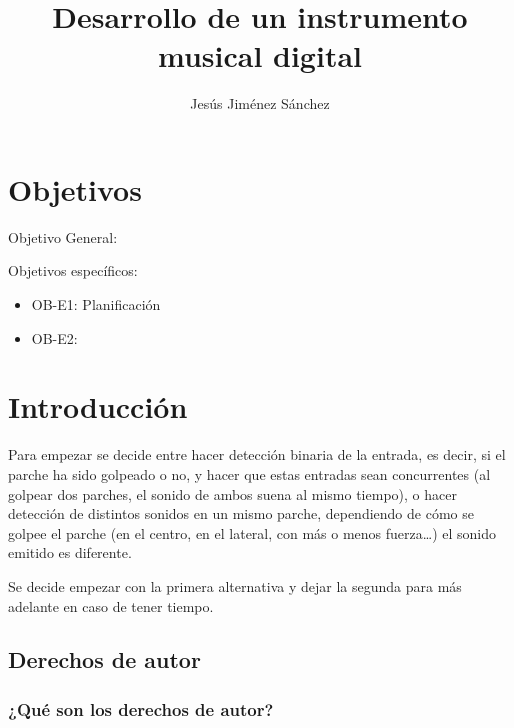 \documentclass{article}
\title{Desarrollo de un instrumento musical digital}
\author{ Jesús Jiménez Sánchez }
\begin{document}
\maketitle

\newpage
\tableofcontents
\newpage

\section*{Objetivos} %
\label{sec:Objetivos}

    Objetivo General:

    Objetivos específicos:
    \begin{itemize}
        \item OB-E1: Planificación
        \item OB-E2:
    \end{itemize}


\section{Introducción} %
\label{sec:Introduccion}

    Para empezar se decide entre hacer detección binaria de la entrada, es decir, si el parche ha sido golpeado o no, y
    hacer que estas entradas sean concurrentes (al golpear dos parches, el sonido de ambos suena al mismo tiempo), o
    hacer detección de distintos sonidos en un mismo parche, dependiendo de cómo se golpee el parche (en el centro, en
    el lateral, con más o menos fuerza…) el sonido emitido es diferente.\newline

    Se decide empezar con la primera alternativa y dejar la segunda para más adelante en caso de tener tiempo.

    \subsection{Derechos de autor} %
    \label{sub:DerechosDeAutor}
        \subsubsection{¿Qué son los derechos de autor?} %
        \label{ssub:QueSonLosDerechosDeAutor}
\end{document}
